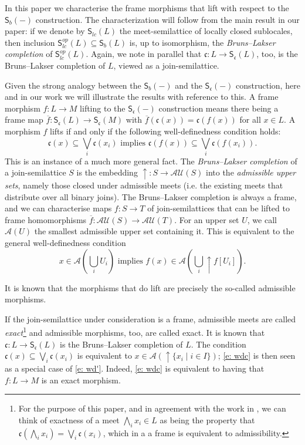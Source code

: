 \documentclass[11pt,a4paper,reqno]{amsart}
\newcommand{\tbigcup}{\mathop{\textstyle \bigcup }}%
\newcommand{\tbigvee}{\mathop{\textstyle \bigvee }}%
\def\SS{\mathsf{S}}
\def\cl{\mathfrak{c}}
\theoremstyle{definition}
\theoremstyle{remark}
\newcommand{\ca}[1]{\mathcal{#1}}
\newcommand{\mf}{\mathsf}
\newcommand{\se}{\subseteq}
\newcommand{\Sc}{\mf{S}_{\cl}}
\newcommand{\Sb}{\mf{S}_b}
\newcommand{\up}{{\uparrow}}
\begin{document}
In this paper we characterise the frame morphisms that lift with respect to the $\Sb(-)$ construction. The characterization will follow from the main result in our paper: if we denote by $\SS_{lc}(L)$ the meet-semilattice of locally closed sublocales, then inclusion $\mf{S}_{lc}^{op}(L)\subseteq \SS_b(L)$ is, up to isomorphism, the \emph{Bruns--Lakser completion} of $\mf{S}_{lc}^{op}(L)$. Again, we note in parallel that $\cl:L\to \Sc(L)$, too, is the Bruns--Lakser completion of $L$, viewed as a join-semilattice.


Given the strong analogy between the $\Sb(-)$ and the $\Sc(-)$ construction, here and in our work we will illustrate the results with reference to this. A frame morphism $f:L\to M$ lifting to the $\Sc(-)$ construction means there being a frame map $\overline{f}:\Sc(L)\to \Sc(M)$ with $\overline{f}(\cl(x))=\cl(f(x))$ for all $x\in L$. A morphism $f$ lifts if and only if the following well-definedness condition holds: 
\begin{equation*}
\cl(x)\se \tbigvee_i \cl(x_i)\text{ implies }\cl(f(x)) \se \tbigvee_i \cl(f(x_i)).   \tag{WDc} \label{e: wdc}
\end{equation*}
 This is an instance of a much more general fact. The \emph{Bruns--Lakser completion} \cite{BrunsLakser1970} of a join-semilattice $S$ is the embedding $\up:S\to \ca{AU}(S)$ into the \emph{admissible upper sets}, namely those closed under admissible meets (i.e. the existing meets that distribute over all binary joins). The Bruns--Lakser completion is always a frame, and we can characterise maps $f:S\to T$ of join-semilattices that can be lifted to frame homomorphisms $\overline{f}\colon\ca{AU}(S)\to\ca{AU}(T)$. For an upper set $U$, we call $\ca{A}(U)$ the smallest admissible upper set containing it. This is equivalent to the general well-definedness condition
\begin{equation*}
x\in \ca{A} (\tbigcup_i U_i)\text{ implies }f(x)\in \ca{A}(\tbigcup_i \up f[U_i]).   \tag{WD} \label{e: wd'}
\end{equation*}

It is known that the morphisms that do lift are precisely the so-called admissible morphisms. 


If the join-semilattice under consideration is a frame, admissible meets are called \emph{exact}\footnote{For the purpose of this paper, and in agreement with the work in \cite{moshier22}, we can think of exactness of a meet $\bigwedge_i x_i\in L$ as being the property that $\cl(\bigwedge_i x_i)=\bigvee_i \cl(x_i)$, which in a a frame is equivalent to admissibility.} and admissible morphisms, too, are called exact. It is known that $\cl:L\to \Sc(L)$ is the Bruns--Lakser completion of $L$. The condition $\cl(x)\se \tbigvee_i \cl(x_i)$ is equivalent to $x\in \ca{A}(\up \{x_i\mid i\in I\})$; \eqref{e: wdc} is then seen as a special case of \eqref{e: wd'}. Indeed, \eqref{e: wdc} is equivalent to having that $f:L\to M$ is an exact morphism.
\end{document}
